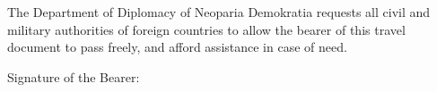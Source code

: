 \documentclass[a4paper,10pt]{article}
\begin{document}
    \vspace{4mm}

    \begin{minipage}[t][27mm][t]{174mm}
        \begin{minipage}[t][25mm][t]{84mm}
            \raggedright
            The Department of Diplomacy of Neoparia Demokratia requests all civil and military authorities
                of foreign countries to allow the bearer of this travel document to pass freely, and afford assistance in case of need.
        \end{minipage}\hfill%
        \begin{minipage}[t][25mm][t]{84mm}
            Signature of the Bearer:
            
            \newline
            \underline{\footnotesize\hspace{160pt}}
        \end{minipage}
        
    \end{minipage}
\end{document}
